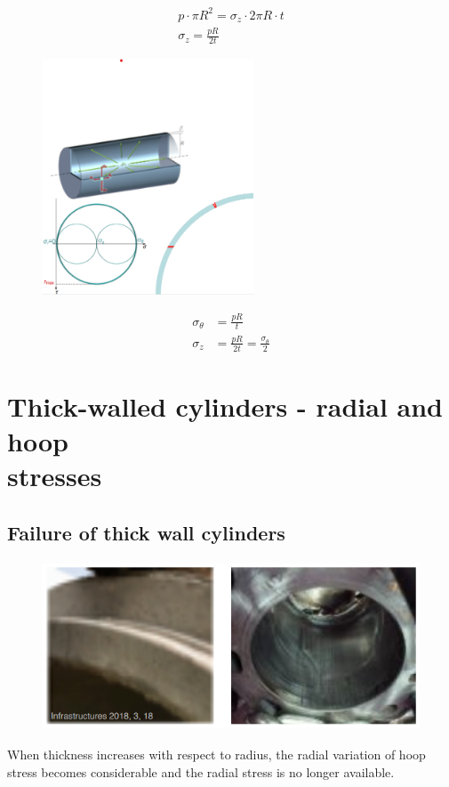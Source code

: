 \documentclass[class=report, crop=false, 12pt,a4paper]{standalone}
\begin{document}
\begin{gather}
    p \cdot \pi R^2 = \sigma_z \cdot 2 \pi R \cdot t\\
    \sigma_z = \frac{pR}{2t}
\end{gather}
\begin{figure}[H]
    \centering
    \includegraphics[height = 7cm]{../img/diagram105.png}
    \caption{}
\end{figure}
\begin{align}
    \sigma_{\theta} &= \frac{pR}{t}\\
    \sigma_z &= \frac{pR}{2t} = \frac{\sigma_{\theta}}{2}
\end{align}
\section{Thick-walled cylinders - radial and hoop\\ stresses}
\subsection{Failure of thick wall cylinders}
\begin{figure}[H]
    \centering
    \includegraphics[height = 5cm]{../img/diagram106.png}
    \caption{}
\end{figure}
When thickness increases with respect to radius, the radial variation of hoop stress becomes considerable and the radial stress is no longer available.
\end{document}
